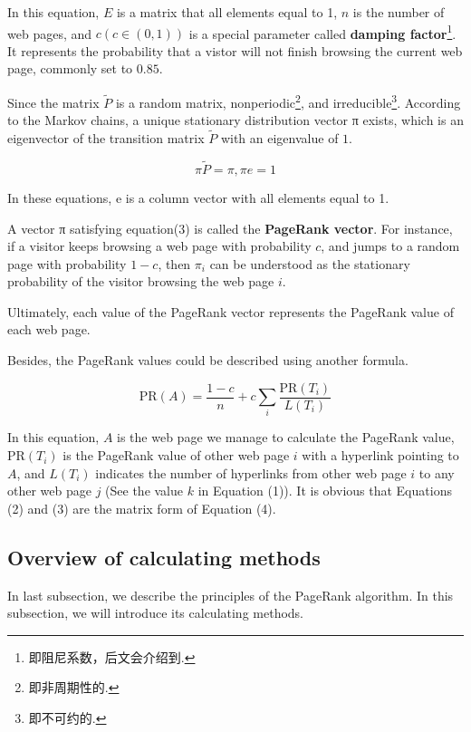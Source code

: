 \documentclass[lettersize,journal,12pt,conference]{IEEEtran}
\begin{document}
In this equation, $E$ is a matrix that all elements equal to 1, $n$ is the number of web pages, and \(c (c \in (0,1))\) is a special parameter called \textbf{damping factor}\footnote[1]{即阻尼系数，后文会介绍到.}. It represents the probability that a vistor will not finish browsing the current web page, commonly set to $0.85$\cite{ref4}.

Since the matrix $\widetilde{P}$ is a random matrix, nonperiodic\footnote[2]{即非周期性的.}, and irreducible\footnote[3]{即不可约的.}. According to the Markov chains\cite{ref5}, a unique stationary distribution vector π exists, which is an eigenvector of the transition matrix $\widetilde{P}$ with an eigenvalue of $1$\cite{ref6}. 

\begin{equation}
	\label{eq:3}
	\pi \widetilde{P} = \pi , \pi e = 1
\end{equation}

In these equations, e is a column vector with all elements equal to 1. 

A vector π satisfying equation(3) is called the \textbf{PageRank vector}. For instance, if a visitor keeps browsing a web page with probability $c$, and jumps to a random page with probability $1 - c$, then $\pi_i$ can be understood as the stationary probability of the visitor browsing the web page $i$.

Ultimately, each value of the PageRank vector represents the PageRank value of each web page. 

Besides, the PageRank values could be described using another formula.

\begin{equation}
	\label{eq:4}
	\text{PR}(A) = \frac{1 - c}{n} + c \sum_{i} \frac{\text{PR}(T_i)}{L(T_i)}
\end{equation}

In this equation, $A$ is the web page we manage to calculate the PageRank value,  $\text{PR}(T_i)$ is the PageRank value of other web page $i$ with a hyperlink pointing to $A$, and $L(T_i)$ indicates the number of hyperlinks from other web page $i$  to any other web page $j$ (See the value $k$ in Equation (1)). It is obvious that Equations (2) and (3) are the matrix form of Equation (4).

\subsection{Overview of calculating methods}

In last subsection, we describe the principles of the PageRank algorithm. In this subsection, we will introduce its calculating methods.
\end{document}
